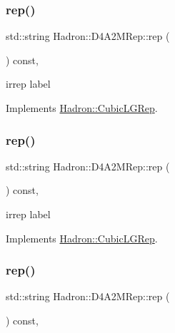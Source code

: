 \subsubsection{\texorpdfstring{rep()}{rep()}\hspace{0.1cm}{\footnotesize\ttfamily [1/3]}}
{\footnotesize\ttfamily std\+::string Hadron\+::\+D4\+A2\+M\+Rep\+::rep (\begin{DoxyParamCaption}{ }\end{DoxyParamCaption}) const\hspace{0.3cm}{\ttfamily [inline]}, {\ttfamily [virtual]}}

irrep label 

Implements \mbox{\hyperlink{structHadron_1_1CubicLGRep_a50f5ddbb8f4be4cee0106fa9e8c75e6c}{Hadron\+::\+Cubic\+L\+G\+Rep}}.

\mbox{\label{structHadron_1_1D4A2MRep_ab6b82d71a2ad447c611e9b26784bc880}} 
\subsubsection{\texorpdfstring{rep()}{rep()}\hspace{0.1cm}{\footnotesize\ttfamily [2/3]}}
{\footnotesize\ttfamily std\+::string Hadron\+::\+D4\+A2\+M\+Rep\+::rep (\begin{DoxyParamCaption}{ }\end{DoxyParamCaption}) const\hspace{0.3cm}{\ttfamily [inline]}, {\ttfamily [virtual]}}

irrep label 

Implements \mbox{\hyperlink{structHadron_1_1CubicLGRep_a50f5ddbb8f4be4cee0106fa9e8c75e6c}{Hadron\+::\+Cubic\+L\+G\+Rep}}.

\mbox{\label{structHadron_1_1D4A2MRep_ab6b82d71a2ad447c611e9b26784bc880}} 
\subsubsection{\texorpdfstring{rep()}{rep()}\hspace{0.1cm}{\footnotesize\ttfamily [3/3]}}
{\footnotesize\ttfamily std\+::string Hadron\+::\+D4\+A2\+M\+Rep\+::rep (\begin{DoxyParamCaption}{ }\end{DoxyParamCaption}) const\hspace{0.3cm}{\ttfamily [inline]}, {\ttfamily [virtual]}}

